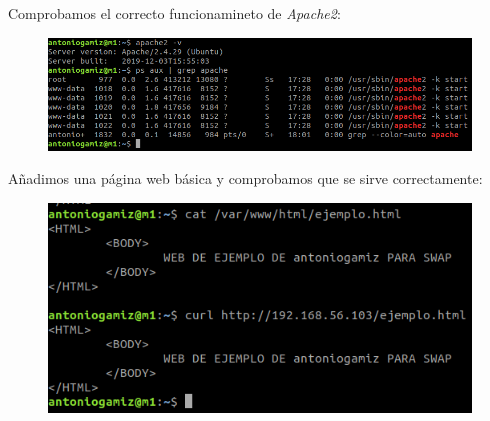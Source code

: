 \documentclass[12pt]{article}
\begin{document}
Comprobamos el correcto funcionamineto de \textit{Apache2}:

\begin{figure}[H]
  \center
  \includegraphics[scale=0.5]{img/115.png}
\end{figure}

Añadimos una página web básica y comprobamos que se sirve correctamente:

\begin{figure}[H]
  \center
  \includegraphics[scale=0.5]{img/116.png}
\end{figure}
\end{document}
